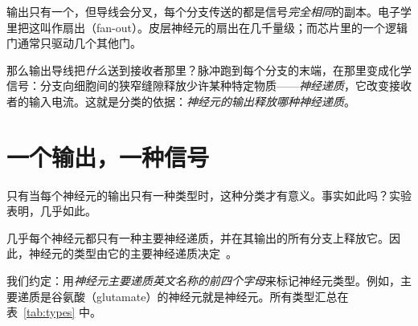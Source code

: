 输出只有一个，但导线会分叉，每个分支传送的都是信号\emph{完全相同}的副本。电子学里把这叫作扇出（fan-out）。皮层神经元的扇出在几千量级；而芯片里的一个逻辑门通常只驱动几个其他门。

那么输出导线把\emph{什么}送到接收者那里？脉冲跑到每个分支的末端，在那里变成化学信号：分支向细胞间的狭窄缝隙释放少许某种特定物质——\emph{神经递质}，它改变接收者的输入电流。这就是分类的依据：\emph{神经元的输出释放哪种神经递质}。

\section{一个输出，一种信号}

只有当每个神经元的输出只有一种类型时，这种分类才有意义。事实如此吗？实验表明，几乎如此。

\begin{keyblock}
\begin{proposition}
\label{prop:dale}
几乎每个神经元都只有一种主要神经递质，并在其输出的所有分支上释放它。因此，神经元的类型由它的主要神经递质决定~\cite{Strata1999}。
\end{proposition}
\end{keyblock}

我们约定：用\emph{神经元主要递质英文名称的前四个字母}来标记神经元类型。例如，主要递质是谷氨酸（glutamate）的神经元就是神经元。所有类型汇总在表~\ref{tab:types} 中。

